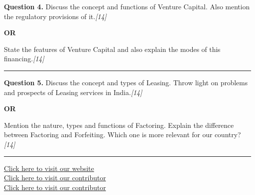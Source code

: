 \documentclass[11pt,a4paper]{article}
\newcommand{\pts}[1]{\hfill   \textit{[#1]}}
\begin{document}
\noindent   \textbf{Question 4.}
Discuss the concept and functions of Venture Capital. Also mention the regulatory provisions of it.\pts{14}

\centerline{   \textbf{OR}}

State the features of Venture Capital and also explain the modes of this financing.\pts{14}

\medskip\rule{\linewidth}{0.2pt}




\noindent   \textbf{Question 5.}
Discuss the concept and types of Leasing. Throw light on problems and prospects of Leasing services in India.\pts{14}

\centerline{   \textbf{OR}}

Mention the nature, types and functions of Factoring. Explain the difference between Factoring and Forfeiting. Which one is more relevant for our country?\pts{14}

\vfill
\rule{\linewidth}{0.4pt}

\begin{center}\small
\href{https://bhu-exam.vercel.app/}{Click here to visit our website}\\[4pt]
\href{https://me-aryan.vercel.app/}{Click here to visit our contributor}\\[4pt]
\href{https://quashan-me.vercel.app/}{Click here to visit our contributor}
\end{center}
\end{document}
